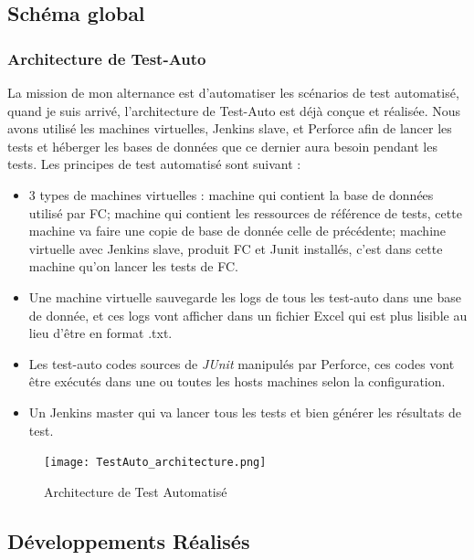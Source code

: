 \subsection{Schéma global}

    \subsubsection{Architecture de Test-Auto}
    La mission de mon alternance est d'automatiser les scénarios de test automatisé, quand je suis arrivé, l'architecture de Test-Auto est déjà conçue et réalisée. Nous avons utilisé les machines virtuelles, Jenkins slave, et Perforce afin de lancer les tests et héberger les bases de données que ce dernier aura besoin pendant les tests. Les principes de test automatisé sont suivant : 
    \begin{itemize}
        \item 3 types de machines virtuelles : machine qui contient la base de données utilisé par FC; machine qui contient les ressources de référence de tests, cette machine va faire une copie de base de donnée celle de précédente; machine virtuelle avec Jenkins slave, produit FC et Junit installés, c'est dans cette machine qu'on lancer les tests de FC.
        \item Une machine virtuelle sauvegarde les logs de tous les test-auto dans une base de donnée, et ces logs vont afficher dans un fichier Excel qui est plus lisible au lieu d'être en format .txt.
        \item Les test-auto codes sources de \textit{JUnit} manipulés par Perforce, ces codes vont être exécutés dans une ou toutes les hosts machines selon la configuration.
        \item Un Jenkins master qui va lancer tous les tests et bien générer les résultats de test.
    \end{itemize}
    \begin{figure}[H]
        \centering
        \texttt{[image: TestAuto\_architecture.png]}
        \caption{Architecture de Test Automatisé}
        \label{fig:Architec_testAuto}
    \end{figure}

\subsection{Développements Réalisés}
 
